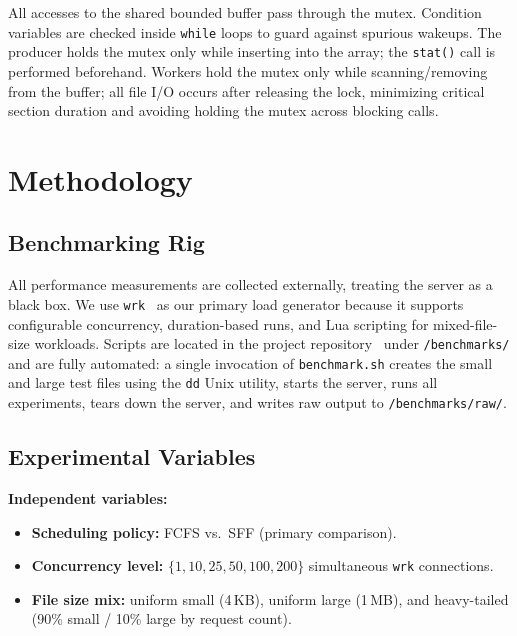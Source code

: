\documentclass[conference]{IEEEtran}
\begin{document}
All accesses to the shared bounded buffer pass through the mutex. Condition
variables are checked inside \texttt{while} loops to guard against spurious
wakeups. The producer holds the mutex only while inserting into the array;
the \texttt{stat()} call is performed beforehand. Workers hold the mutex only
while scanning/removing from the buffer; all file I/O occurs after releasing
the lock, minimizing critical section duration and avoiding holding the mutex
across blocking calls.

\section{Methodology}
\label{sec:methodology}

\subsection{Benchmarking Rig}

All performance measurements are collected externally, treating the server
as a black box. We use \texttt{wrk}~\cite{wrk} as our primary load generator
because it supports configurable concurrency, duration-based runs, and Lua
scripting for mixed-file-size workloads. Scripts are located in the project
repository~\cite{repo} under \texttt{/benchmarks/} and are fully automated:
a single invocation of \texttt{benchmark.sh} creates the small and large test
files using the \texttt{dd} Unix utility, starts the server, runs all
experiments, tears down the server, and writes raw output to
\texttt{/benchmarks/raw/}.

\subsection{Experimental Variables}

\textbf{Independent variables:}
\begin{itemize}
  \item \textbf{Scheduling policy:} FCFS vs.\ SFF (primary comparison).
  \item \textbf{Concurrency level:} $\{1, 10, 25, 50, 100, 200\}$ simultaneous
    \texttt{wrk} connections.
  \item \textbf{File size mix:} uniform small (4\,KB), uniform large (1\,MB),
    and heavy-tailed (90\% small / 10\% large by request count).
\end{itemize}
\end{document}
